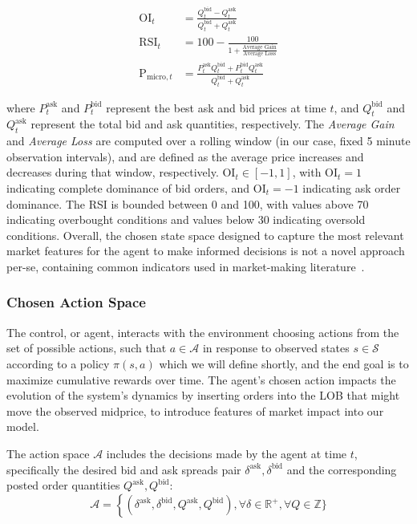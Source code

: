 \begin{equation}
    \begin{aligned}
        \text{OI}_t &= \frac{Q_t^{\text{bid}} - Q_t^{\text{ask}}}{Q_t^{\text{bid}} + Q_t^{\text{ask}}}\\
        \text{RSI}_t &= 100 - \frac{100}{1 + \frac{\text{Average Gain}}{\text{Average Loss}}}\\
        \text{P}_{\text{micro}, t} &= \frac{P_t^{\text{ask}} Q_t^{\text{bid}} + P_t^{\text{bid}} Q_t^{\text{ask}}}{Q_t^{\text{bid}} + Q_t^{\text{ask}}}
    \end{aligned}
    \label{eq:features}
\end{equation}

where \( P_t^{\text{ask}} \) and \( P_t^{\text{bid}} \) represent the best ask and bid prices at time \( t \),
and \( Q_t^{\text{bid}} \) and \( Q_t^{\text{ask}} \) represent the total bid and ask quantities, respectively.
The \textit{Average Gain} and \textit{Average Loss} are computed over a rolling window (in our case, fixed 5 minute observation intervals),
and are defined as the average price increases and decreases during that window, respectively.
\( \text{OI}_t \in [-1, 1] \), with \( \text{OI}_t = 1 \) indicating complete dominance of bid orders, and \( \text{OI}_t = -1 \) indicating ask order dominance.
The RSI is bounded between 0 and 100, with values above 70 indicating overbought conditions and values below 30 indicating oversold conditions.
Overall, the chosen state space designed to capture the most relevant market features for the agent to make informed decisions is
not a novel approach per-se, containing common indicators used in market-making literature~\cite{Gueant2022, Selser2021a, FalcesMarin2022}.

\subsubsection{Chosen Action Space}

The control, or agent, interacts with the environment choosing actions from the set of possible actions,
such that $a \in \mathcal{A}$ in response to observed states $s \in \mathcal{S}$ according to a policy $\pi (s, a)$ which we will define shortly,
and the end goal is to maximize cumulative rewards over time.
The agent's chosen action impacts the evolution of the system's dynamics by inserting orders into the LOB that might move the observed midprice,
to introduce features of market impact into our model.

The action space $\mathcal{A}$ includes the decisions made by the agent at time $t$, specifically the desired bid and ask spreads pair
$\delta^{\text{ask}}, \delta^{\text{bid}}$ and the corresponding posted order quantities $Q^{\text{ask}}, Q^{\text{bid}}$:
$$
\mathcal{A} = \left\{ (\delta^{\text{ask}}, \delta^{\text{bid}}, Q^{\text{ask}}, Q^{\text{bid}}), \forall \delta \in \mathbb{R}^+, \forall Q \in \mathbb{Z}\} \right.
$$

